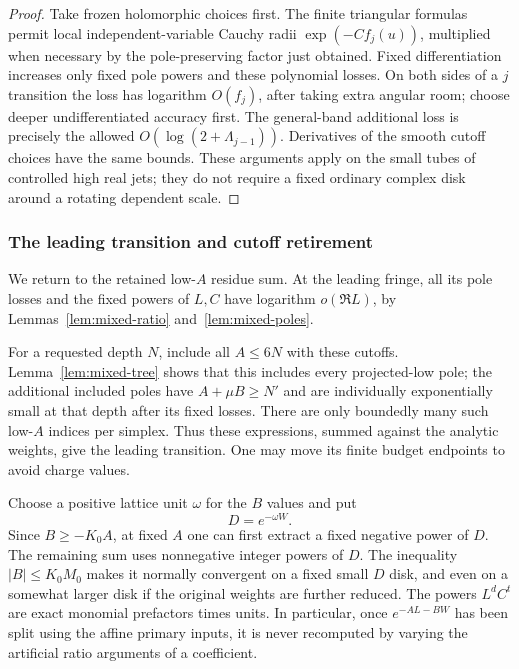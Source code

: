 \begin{proof}
Take frozen holomorphic choices first. The finite triangular
formulas permit local independent-variable Cauchy radii
$\exp(-C f_j(u))$, multiplied when necessary by the pole-preserving
factor just obtained. Fixed differentiation increases only fixed
pole powers and these polynomial losses. On both sides of a $j$
transition the loss has logarithm $O(f_j)$, after taking extra
angular room; choose deeper undifferentiated accuracy first.
The general-band additional loss is precisely the allowed
$O(\log(2+\Lambda_{j-1}))$. Derivatives of the smooth cutoff choices
have the same bounds. These arguments apply on the small tubes of
controlled high real jets; they do not require a fixed ordinary
complex disk around a rotating dependent scale.
\end{proof}

\subsubsection{The leading transition and cutoff retirement}

We return to the retained low-$A$ residue sum. At the leading fringe,
all its pole losses and the fixed powers of $L,C$ have logarithm
$o(\Re L)$, by Lemmas~\ref{lem:mixed-ratio} and~\ref{lem:mixed-poles}.

For a requested depth $N$, include all $A\leq6N$ with these
cutoffs. Lemma~\ref{lem:mixed-tree} shows that this includes every
projected-low pole; the additional included poles have
$A+\mu B\geq N'$ and are individually exponentially small at
that depth after its fixed losses. There are only boundedly many
such low-$A$ indices per simplex. Thus these expressions, summed
against the analytic weights, give the leading transition.
One may move its finite budget endpoints to avoid charge values.

Choose a positive lattice unit $\omega$ for the $B$ values and put
\begin{equation}\label{eq:mixed-small-D}
 D=e^{-\omega W}.
\end{equation}
Since $B\geq-K_0A$, at fixed $A$ one can first extract a fixed
negative power of $D$. The remaining sum uses nonnegative integer
powers of $D$. The inequality $|B|\leq K_0M_0$ makes it normally
convergent on a fixed small $D$ disk, and even on a somewhat larger
disk if the original weights are further reduced. The powers
$L^dC^t$ are exact monomial prefactors times units. In particular,
once $e^{-AL-BW}$ has been split using the affine primary inputs,
it is never recomputed by varying the artificial ratio arguments
of a coefficient.

